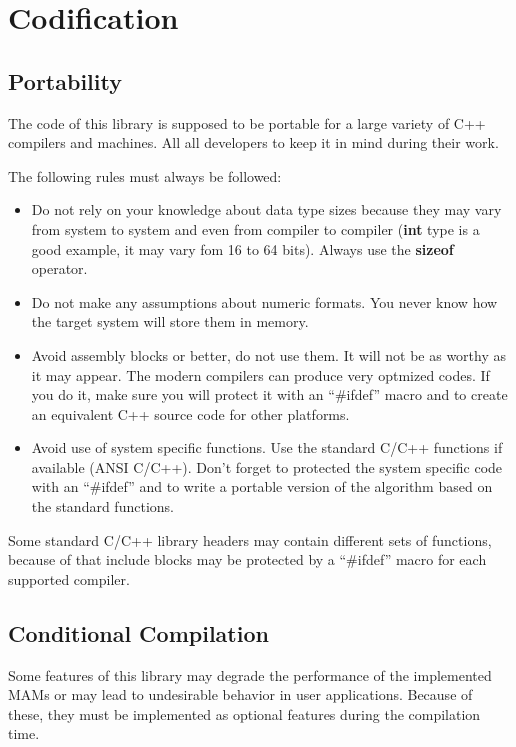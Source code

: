 \chapter{Codification}

\section{Portability}

The code of this library is supposed to be portable for a large variety of C++ compilers and
machines. All all developers to keep it in mind during their work.

The following rules must always be followed:

\begin{itemize}
	\item Do not rely on your knowledge about data type sizes because they may vary from
		system to system and even from compiler to compiler ({\bf int} type is a
		good example, it may vary fom 16 to 64 bits). Always use the {\bf sizeof} operator.
	\item Do not make any assumptions about numeric formats. You never know how the target
		system will store them in memory.
	\item Avoid assembly blocks or better, do not use them. It will not be as worthy as it may
		appear. The modern compilers can produce very optmized codes. If you do it, make sure
		you will protect it with an ``\#ifdef'' macro and to create an equivalent C++ source
		code for other platforms.
	\item Avoid use of system specific functions. Use the standard C/C++ functions if available
		(ANSI C/C++). Don't forget to protected the system specific code with an ``\#ifdef'' and
		to write a portable version of the algorithm based on the standard functions.
\end{itemize}

Some standard C/C++ library headers may contain different sets of functions, because of that
include blocks may be protected by a ``\#ifdef'' macro for each supported compiler.

\section{Conditional Compilation}

Some features of this library may degrade the performance of the implemented MAMs or may
lead to undesirable behavior in user applications. Because of these, they must be
implemented as optional features during the compilation time.

